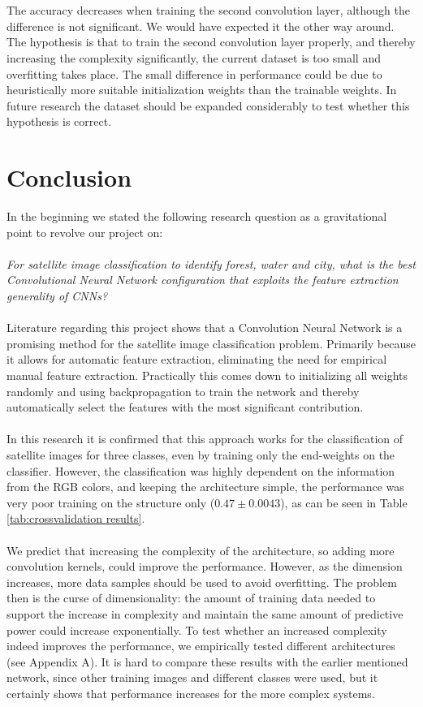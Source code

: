 \documentclass[a4paper,onecolumn]{report}
\begin{document}
\\\\
The accuracy decreases when training the second convolution layer, although the difference is not significant. We would have expected it the other way around. The hypothesis is that to train the second convolution layer properly, and thereby increasing the complexity significantly, the current dataset is too small and overfitting takes place. The small difference in performance could be due to heuristically more suitable initialization weights than the trainable weights. In future research the dataset should be expanded considerably to test whether this hypothesis is correct. 

\chapter{Conclusion}
In the beginning we stated the following research question as a gravitational point to revolve our project on:
\\\\
\emph{For satellite image classification to identify forest, water and city, what is the best Convolutional Neural Network configuration that exploits the feature extraction generality of CNNs?}
\\\\
Literature regarding this project shows that a Convolution Neural Network is a promising method for the satellite image classification problem. Primarily because it allows for automatic feature extraction, eliminating the need for empirical manual feature extraction. Practically this comes down to initializing all weights randomly and using backpropagation to train the network and thereby automatically select the features with the most significant contribution. 
\\\\
In this research it is confirmed that this approach works for the classification of satellite images for three classes, even by training only the end-weights on the classifier. However, the classification was highly dependent on the information from the RGB colors, and keeping the architecture simple, the performance was very poor training on the structure only ($0.47 \pm 0.0043$), as can be seen in Table \ref{tab:crossvalidation results}. 
\\\\
We predict that increasing the complexity of the architecture, so adding more convolution kernels, could improve the performance. However, as the dimension increases, more data samples should be used to avoid overfitting. The problem then is the curse of dimensionality: the amount of training data needed to support the increase in complexity and maintain the same amount of predictive power could increase exponentially. To test whether an increased complexity indeed improves the performance, we empirically tested different architectures (see Appendix A). It is hard to compare these results with the earlier mentioned network, since other training images and different classes were used, but it certainly shows that performance increases for the more complex systems.
\end{document}
